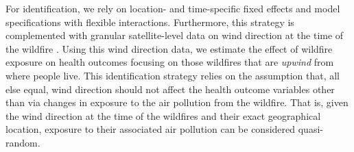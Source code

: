 \documentclass[11pt]{article}
\begin{document}
\begin{spacing}{1.3}


For identification, we rely on location- and time-specific fixed effects and model specifications with flexible interactions. Furthermore, this strategy is complemented with granular satellite-level data on wind direction at the time of the wildfire \citep{zivin2020unintended,RangelVogl2019}. Using this wind direction data, we estimate the effect of wildfire exposure on health outcomes focusing on those wildfires that are \textit{upwind} from where people live.  This identification strategy relies on the assumption that, all else equal, wind direction should not affect the health outcome variables other than via changes in exposure to the air pollution from the wildfire. That is, given the wind direction at the time of the wildfires and their exact geographical location, exposure to their associated air pollution can be considered quasi-random. 



\end{spacing}
\end{document}
